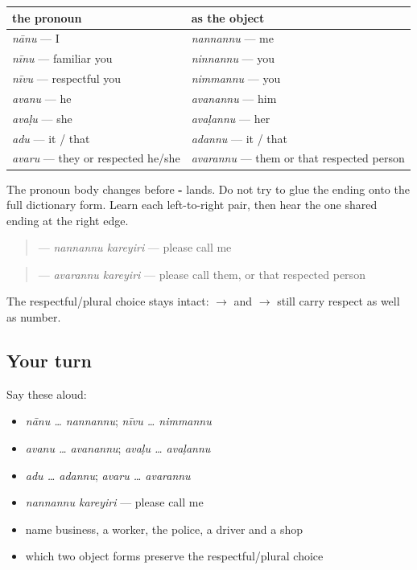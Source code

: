 \begin{grammarlens}[title={Grammar Lens: the same -\kn{ಅನ್ನು}, on changed pronoun bodies}]
\noindent
\begin{tabularx}{\linewidth}{@{}>{\raggedright\arraybackslash}X>{\raggedright\arraybackslash}X@{}}
\toprule
\textbf{the pronoun} & \textbf{as the object} \\
\midrule
\kn{ನಾನು} \emph{nānu} — I & \kn{ನನ್ನನ್ನು} \emph{nannannu} — me \\
\kn{ನೀನು} \emph{nīnu} — familiar you & \kn{ನಿನ್ನನ್ನು} \emph{ninnannu} — you \\
\kn{ನೀವು} \emph{nīvu} — respectful you & \kn{ನಿಮ್ಮನ್ನು} \emph{nimmannu} — you \\
\kn{ಅವನು} \emph{avanu} — he & \kn{ಅವನನ್ನು} \emph{avanannu} — him \\
\kn{ಅವಳು} \emph{avaḷu} — she & \kn{ಅವಳನ್ನು} \emph{avaḷannu} — her \\
\kn{ಅದು} \emph{adu} — it / that & \kn{ಅದನ್ನು} \emph{adannu} — it / that \\
\kn{ಅವರು} \emph{avaru} — they or respected he/she & \kn{ಅವರನ್ನು} \emph{avarannu} — them or that respected person \\
\bottomrule
\end{tabularx}

The pronoun body changes before \textbf{-} lands. Do not try to glue the ending onto the full dictionary form. Learn each left-to-right pair, then hear the one shared ending at the right edge.

\begin{quote}
\textbf{ } — \emph{nannannu kareyiri} — please call me
\end{quote}

\begin{quote}
\textbf{ } — \emph{avarannu kareyiri} — please call them, or that respected person
\end{quote}

The respectful/plural choice stays intact: \textbf{ $\to$ } and \textbf{ $\to$ } still carry respect as well as number.
\end{grammarlens}

\subsection*{Your turn}
Say these aloud:

\begin{itemize}
\raggedright
  \item \emph{nānu … nannannu}; \emph{nīvu … nimmannu}
  \item \emph{avanu … avanannu}; \emph{avaḷu … avaḷannu}
  \item \emph{adu … adannu}; \emph{avaru … avarannu}
  \item \emph{nannannu kareyiri} — please call me
  \item name business, a worker, the police, a driver and a shop
  \item which two object forms preserve the respectful/plural choice
\end{itemize}


